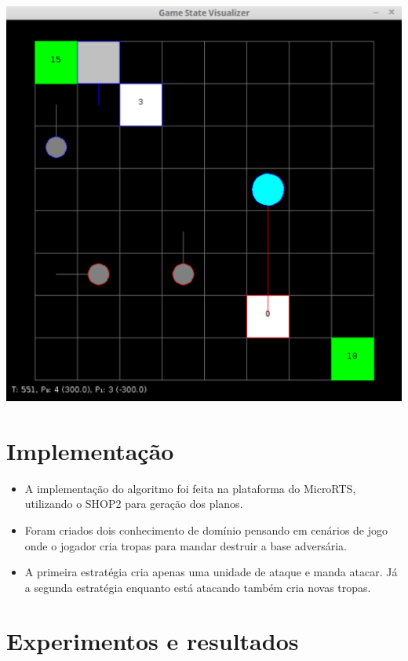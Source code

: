 \documentclass[a0,portrait]{a0poster}
\newcommand\itemadjust{\itemsep.5em \parskip0pt \parsep0pt}
\begin{document}
\begin{multicols}{2}
	\vspace{8mm}
	
	\begin{center}
		\includegraphics[width=0.5\linewidth]{fig/microRts.pdf}
		\label{fig:microrts}
	\end{center}	
	
	\color{NavyBlue}
	\section*{\huge Implementação}
	\color{Black}
	\begin{itemize}
		\item A implementação do algoritmo foi feita na plataforma do MicroRTS, utilizando o SHOP2 para geração dos planos.
		\item Foram criados dois conhecimento de domínio pensando em cenários de jogo onde o jogador cria tropas para mandar destruir a base adversária.
		\item A primeira estratégia cria apenas uma unidade de ataque e manda atacar. Já a segunda estratégia enquanto está atacando também cria novas tropas.  
	\end{itemize}
	
	\color{NavyBlue}
	\section*{\huge Experimentos e resultados}
	\color{Black}
	

\end{multicols}
\end{document}

